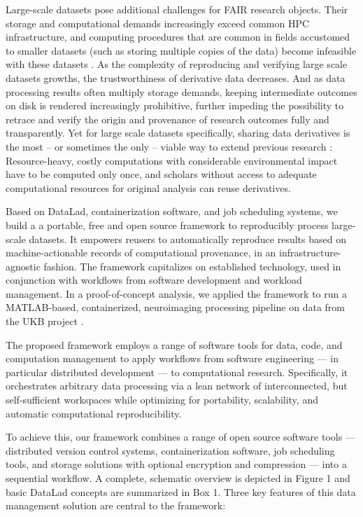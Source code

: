 Large-scale datasets pose additional challenges for \gls{FAIR} research objects.
Their storage and computational demands increasingly exceed common \gls{HPC} infrastructure, and computing procedures that are common in fields accustomed to smaller datasets (such as storing multiple copies of the data) become infeasible with these datasets \citep{horien2021hitchhiker}.
As the complexity of reproducing and verifying large scale datasets growths, the trustworthiness of derivative data decreases.
And as data processing results often multiply storage demands, keeping intermediate outcomes on disk is rendered increasingly prohibitive, further impeding the possibility to retrace and verify the origin and provenance of research outcomes fully and transparently.
Yet for large scale datasets specifically, sharing data derivatives is the most -- or sometimes the only -- viable way to extend previous research \citep{craddock2013neuro}:
Resource-heavy, costly computations with considerable environmental impact \citep{portegies2020ecological} have to be computed only once, and scholars without access to adequate computational resources for original analysis can reuse derivatives.


Based on DataLad, containerization software, and job scheduling systems, we build a a portable, free and open source framework to reproducibly process large-scale datasets.
It empowers reusers to automatically reproduce results based on machine-actionable records of computational provenance, in an infrastructure-agnostic fashion.
The framework capitalizes on established technology, used in conjunction with workflows from software development and workload management.
In a proof-of-concept analysis, we applied the framework to run a MATLAB-based, containerized, neuroimaging processing pipeline on data from the UKB project \citep[][comprising 76 TB in 43 million files under strict usage constraints]{matthews2015uk}.

The proposed framework employs a range of software tools for data, code, and computation management to apply workflows from software engineering — in particular distributed development — to computational research. Specifically, it orchestrates arbitrary data processing via a lean network of interconnected, but self-sufficient workspaces while optimizing for portability, scalability, and automatic computational reproducibility.

To achieve this, our framework combines a range of open source software tools — distributed version control systems, containerization software, job scheduling tools, and storage solutions with optional encryption and compression — into a sequential workflow. A complete, schematic overview is depicted in Figure 1 and basic DataLad concepts are summarized in Box 1. Three key features of this data management solution are central to the framework:

